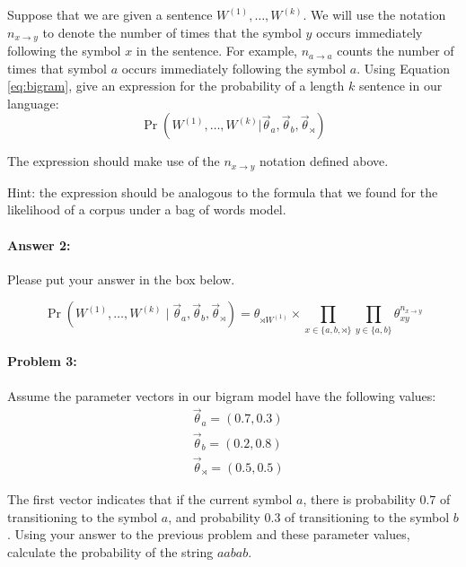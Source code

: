 \documentclass[10pt]{article}
\newenvironment{AnswerBox}{\begin{mdframed}[style=simple]}{\end{mdframed}}
\begin{document}
 Suppose that we are given a sentence $W^{(1)},\dots,W^{(k)}$. We will
use the notation $n_{x \rightarrow y}$ to denote the number of times
that the symbol $y$ occurs immediately following the symbol $x$ in the
sentence. For example, $n_{a \rightarrow a}$ counts the number of
times that symbol $a$ occurs immediately following the symbol $a$.
Using Equation \ref{eq:bigram}, give an expression for the probability
of a length $k$ sentence in our language:
\begin{equation*}
\Pr(W^{(1)},\dots,W^{(k)} | \vec{\theta}_{a}, \vec{\theta}_{b}, \vec{\theta}_{\rtimes})
\end{equation*}

 The expression should make use of the $n_{x \rightarrow y}$ notation
defined above.

 Hint: the expression should be analogous to the formula that we found
for the likelihood of a corpus under a bag of words model.

\paragraph{Answer 2:} Please put your answer in the box below.

\begin{AnswerBox}%

    \[\Pr(W^{(1)}, \dots, W^{(k)} \mid \vec{\theta}_{a}, \vec{\theta}_{b}, \vec{\theta}_{\rtimes}) = \theta_{\rtimes W^{(1)}} \times \prod_{x \in \{a, b, \rtimes\}} \prod_{y \in \{a, b\}} \theta_{xy}^{n_{x \rightarrow y}}\]

    
\end{AnswerBox}%

\hrulefill %

\paragraph{Problem 3:}


Assume the parameter vectors in our bigram model have the following values:
\begin{align*}
&\vec{\theta}_{a} = (0.7,0.3)\\
&\vec{\theta}_{b} = (0.2,0.8)\\
&\vec{\theta}_{\rtimes} = (0.5,0.5)
\end{align*}

 The first vector indicates that if the current symbol $a$,
there is probability $0.7$ of transitioning to the symbol $a$, and
probability $0.3$ of transitioning to the symbol $b$. Using your
answer to the previous problem and these parameter values, calculate
the probability of the string $aabab$.
\end{document}
